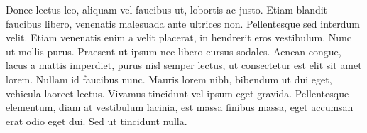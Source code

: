 \documentclass{report}
\begin{document}
	{\Huge Donec lectus leo, aliquam vel faucibus ut, lobortis ac justo. Etiam blandit faucibus libero, venenatis malesuada ante ultrices non. Pellentesque sed interdum velit. Etiam venenatis enim a velit placerat, in hendrerit eros vestibulum. Nunc ut mollis purus. Praesent ut ipsum nec libero cursus sodales. Aenean congue, lacus a mattis imperdiet, purus nisl semper lectus, ut consectetur est elit sit amet lorem. Nullam id faucibus nunc. Mauris lorem nibh, bibendum ut dui eget, vehicula laoreet lectus. Vivamus tincidunt vel ipsum eget gravida. Pellentesque elementum, diam at vestibulum lacinia, est massa finibus massa, eget accumsan erat odio eget dui. Sed ut tincidunt nulla.}
\end{document}
